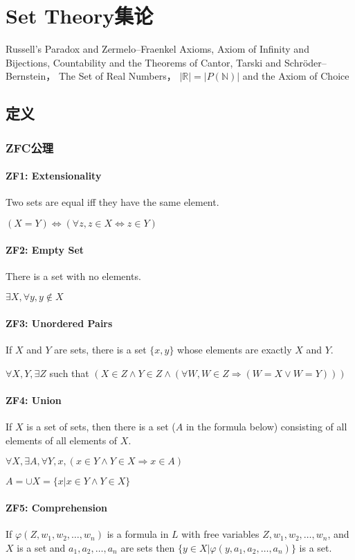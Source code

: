 \documentclass[12pt,a4paper]{ctexrep}
\begin{document}
\fi

\chapter{Set Theory集论}
Russell's Paradox and Zermelo–Fraenkel Axioms, Axiom of Infinity and Bijections, Countability and the Theorems of Cantor, Tarski and Schr\"oder–Bernstein， The Set of Real Numbers， $|\mathbb{R}|=|P(\mathbb{N})|$ and the Axiom of Choice
\section{定义}
\subsection{ZFC公理}
\subsubsection{ZF1: Extensionality}
Two sets are equal iff they have the same element.

$(X=Y) \iff (\forall z, z\in X \iff z\in Y)$

\subsubsection{ZF2: Empty Set}
There is a set with no elements.

$\exists X, \forall y, y \notin X$

\subsubsection{ZF3: Unordered Pairs}
If $X$ and $Y$ are sets, there is a set $\{x,y\}$ whose elements are exactly $X$ and $Y$.

$\forall X,Y, \exists Z$ such that $(X \in Z \wedge Y \in Z \wedge(\forall W, W\in Z \Rightarrow (W = X \vee W = Y)))$
\subsubsection{ZF4: Union}
If $X$ is a set of sets, then there is a set ($A$ in the formula below) consisting of all elements of all elements of $X$.

$\forall X, \exists A, \forall Y,x, (x \in Y\wedge Y \in X \Rightarrow x \in A)$

$A = \cup X = \{x| x\in Y \wedge Y\in X\}$

\subsubsection{ZF5: Comprehension}
If $\varphi(Z,w_1,w_2,\dots,w_n)$ is a formula in $L$ with free variables $Z,w_1,w_2,\dots,w_n$, and $X$ is a set and $a_1,a_2,\dots,a_n$ are sets then $\{y\in X| \varphi(y,a_1,a_2,\dots,a_n)\}$ is a set. 
\end{document}
